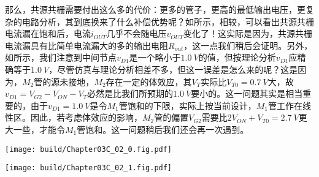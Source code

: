 那么，共源共栅需要付出这么多的代价：更多的管子，更高的最低输出电压，更复杂的电路分析，其到底换来了什么补偿优势呢？如所示，相较，可以看出共源共栅电流漏在饱和后，电流$i_{OUT}$几乎不会随电压$v_{OUT}$变化了！这实际是因为，共源共栅电流漏具有比简单电流漏大的多的输出电阻$R_{out}$，这一点我们稍后会证明。另外，如所示，我们注意到中间节点$v_{D1}$是一个略小于$\SI{1.0}{V}$的值，但按理论分析$v_{D1}$应精确等于$\SI{1.0}{V}$，尽管仿真与理论分析相差不多，但这一误差是怎么来的呢？这是因为，$M_2$管的源未接地，$M_2$存在一定的体效应，其$V_T$实际比$V_{T0}=\SI{0.7}{V}$大，故$v_{D1}=V_{G2}-V_{ON}-V_T$必然是比我们所预期的$\SI{1.0}{V}$要小的。这一问题其实是相当重要的，由于$v_{D1}=\SI{1.0}{V}$是令$M_1$管饱和的下限，实际上按当前设计，$M_1$管工作在线性区。因此，若考虑体效应的影响，$M_2$管的偏置$V_{G2}$需要比$2V_{ON}+V_{T0}=\SI{2.7}{V}$更大一些，才能令$M_1$管饱和。这一问题稍后我们还会再一次遇到。
\begin{Figure}[MOS电流漏的大信号特性]
    \begin{FigureSub}
        \texttt{[image: build/Chapter03C\_02\_0.fig.pdf]}
    \end{FigureSub}
    \begin{FigureSub}
        \texttt{[image: build/Chapter03C\_02\_1.fig.pdf]}
    \end{FigureSub}
\end{Figure}\goodbreak

